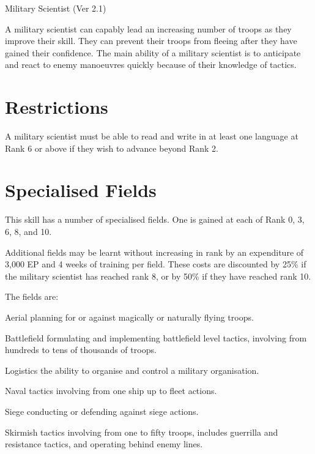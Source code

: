\begin{Chapter}{Military Scientist (Ver 2.1)}

A military scientist can capably lead an increasing number of troops
as they improve their skill. They can prevent their troops from
fleeing after they have gained their confidence. The main ability of a
military scientist is to anticipate and react to enemy manoeuvres
quickly because of their knowledge of tactics.

\section{Restrictions}

A military scientist must be able to read and write in at least one
language at Rank 6 or above if they wish to advance beyond Rank 2.

\section{Specialised Fields}

This skill has a number of specialised fields. One is gained at each
of Rank 0, 3, 6, 8, and 10.

Additional fields may be learnt without increasing in rank by an
expenditure of 3,000 EP and 4 weeks of training per field. These costs
are discounted by 25\% if the military scientist has reached rank 8,
or by 50\% if they have reached rank 10.

The fields are: 

\begin{Description}

\item[Aerial] planning for or against magically or naturally flying
  troops.

\item[Battlefield] formulating and implementing battlefield level
  tactics, involving from hundreds to tens of thousands of troops.

\item[Logistics] the ability to organise and control a military
  organisation.

\item[Naval] tactics involving from one ship up to fleet actions.

\item[Siege] conducting or defending against siege actions.

\item[Skirmish] tactics involving from one to fifty troops, includes
  guerrilla and resistance tactics, and operating behind enemy lines.


\end{Description}
\end{Chapter}
